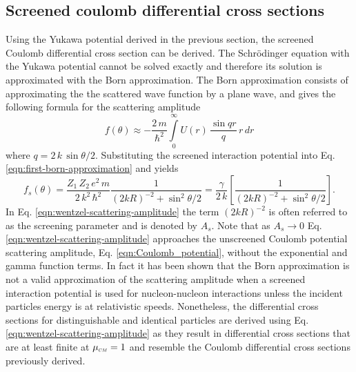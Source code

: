 \subsection{Screened coulomb differential cross sections}
Using the Yukawa potential derived in the previous section, the screened Coulomb differential cross section can be derived. The Schr\"{o}dinger equation with the Yukawa potential cannot be solved exactly and therefore its solution is approximated with the Born approximation. The Born approximation consists of approximating the the scattered wave function by a plane wave, and gives the following formula for the scattering amplitude
\begin{equation} \label{eqn:first-born-approximation}
    f(\theta) \approx - \dfrac{2 \, m}{\hbar^2} \int\limits_0^{\infty} U(r) \, \dfrac{\sin qr}{q} \, r \, dr
\end{equation}
where $q = 2 \, k \, \sin \theta / 2$. Substituting the screened interaction potential into Eq. \eqref{eqn:first-born-approximation} and yields
\begin{equation} \label{eqn:wentzel-scattering-amplitude}
    f_s(\theta) = \dfrac{Z_1 \, Z_2 \, e^2 \, m}{2 \, k^2 \, \hbar^2} \dfrac{1}{(2kR)^{-2} + \sin^2 \theta/2} = \dfrac{\gamma}{2 \, k} \left[\dfrac{1}{(2kR)^{-2} + \sin^2 \theta/2}\right].
\end{equation}
In Eq. \eqref{eqn:wentzel-scattering-amplitude} the term $(2kR)^{-2}$ is often referred to as the screening parameter and is denoted by $A_s$. Note that as $A_s \rightarrow 0$ Eq. \eqref{eqn:wentzel-scattering-amplitude} approaches the unscreened Coulomb potential scattering amplitude, Eq. \eqref{eqn:Coulomb_potential}, without the exponential and gamma function terms. In fact it has been shown that the Born approximation is not a valid approximation of the scattering amplitude when a screened interaction potential is used for nucleon-nucleon interactions unless the incident particles energy is at relativistic speeds. Nonetheless, the differential cross sections for distinguishable and identical particles are derived using Eq. \eqref{eqn:wentzel-scattering-amplitude} as they result in differential cross sections that are at least finite at $\mucm = 1$ and resemble the Coulomb differential cross sections previously derived.

